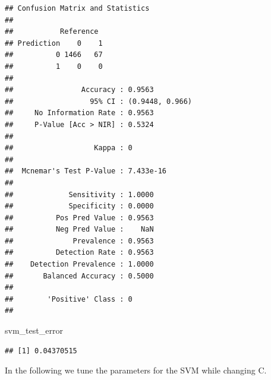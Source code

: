\documentclass[
]{article}
\newenvironment{Shaded}{\begin{snugshade}}{\end{snugshade}}
\newcommand{\AttributeTok}[1]{\textcolor[rgb]{0.77,0.63,0.00}{#1}}
\newcommand{\CommentTok}[1]{\textcolor[rgb]{0.56,0.35,0.01}{\textit{#1}}}
\newcommand{\FunctionTok}[1]{\textcolor[rgb]{0.00,0.00,0.00}{#1}}
\newcommand{\NormalTok}[1]{#1}
\newcommand{\OtherTok}[1]{\textcolor[rgb]{0.56,0.35,0.01}{#1}}
\newcommand{\SpecialCharTok}[1]{\textcolor[rgb]{0.00,0.00,0.00}{#1}}
\renewcommand{\=}[1]{\stackrel{#1}{=}}
\theoremstyle{definition}
\theoremstyle{remark}
\begin{document}
\begin{Shaded}
\end{Shaded}

\begin{verbatim}
## Confusion Matrix and Statistics
## 
##           Reference
## Prediction    0    1
##          0 1466   67
##          1    0    0
##                                          
##                Accuracy : 0.9563         
##                  95% CI : (0.9448, 0.966)
##     No Information Rate : 0.9563         
##     P-Value [Acc > NIR] : 0.5324         
##                                          
##                   Kappa : 0              
##                                          
##  Mcnemar's Test P-Value : 7.433e-16      
##                                          
##             Sensitivity : 1.0000         
##             Specificity : 0.0000         
##          Pos Pred Value : 0.9563         
##          Neg Pred Value :    NaN         
##              Prevalence : 0.9563         
##          Detection Rate : 0.9563         
##    Detection Prevalence : 1.0000         
##       Balanced Accuracy : 0.5000         
##                                          
##        'Positive' Class : 0              
## 
\end{verbatim}

\begin{Shaded}
\begin{Highlighting}[]
\NormalTok{svm\_test\_error}
\end{Highlighting}
\end{Shaded}

\begin{verbatim}
## [1] 0.04370515
\end{verbatim}

In the following we tune the parameters for the SVM while changing C.
\end{document}

